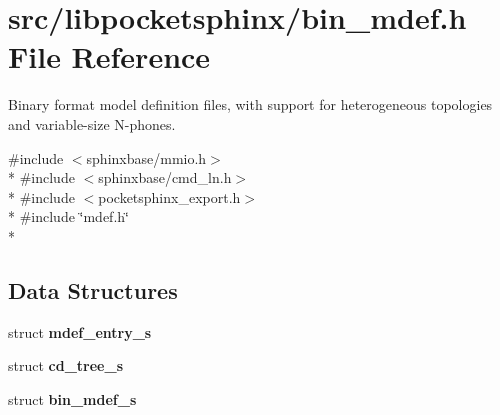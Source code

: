\section{src/libpocketsphinx/bin\+\_\+mdef.h File Reference}
\label{bin__mdef_8h}


Binary format model definition files, with support for heterogeneous topologies and variable-\/size N-\/phones.  


{\ttfamily \#include $<$sphinxbase/mmio.\+h$>$}\\*
{\ttfamily \#include $<$sphinxbase/cmd\+\_\+ln.\+h$>$}\\*
{\ttfamily \#include $<$pocketsphinx\+\_\+export.\+h$>$}\\*
{\ttfamily \#include \char`\"{}mdef.\+h\char`\"{}}\\*
\subsection*{Data Structures}
\begin{DoxyCompactItemize}
\item 
struct {\bf mdef\+\_\+entry\+\_\+s}
\item 
struct {\bf cd\+\_\+tree\+\_\+s}
\item 
struct {\bf bin\+\_\+mdef\+\_\+s}
\end{DoxyCompactItemize}
